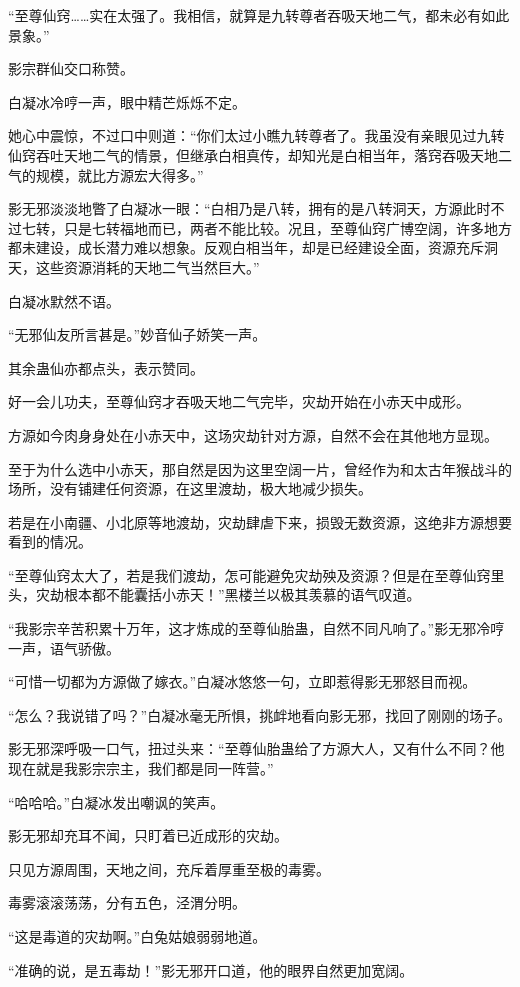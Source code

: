 \begin{this_body}
“至尊仙窍……实在太强了。我相信，就算是九转尊者吞吸天地二气，都未必有如此景象。”

影宗群仙交口称赞。

白凝冰冷哼一声，眼中精芒烁烁不定。

她心中震惊，不过口中则道：“你们太过小瞧九转尊者了。我虽没有亲眼见过九转仙窍吞吐天地二气的情景，但继承白相真传，却知光是白相当年，落窍吞吸天地二气的规模，就比方源宏大得多。”

影无邪淡淡地瞥了白凝冰一眼：“白相乃是八转，拥有的是八转洞天，方源此时不过七转，只是七转福地而已，两者不能比较。况且，至尊仙窍广博空阔，许多地方都未建设，成长潜力难以想象。反观白相当年，却是已经建设全面，资源充斥洞天，这些资源消耗的天地二气当然巨大。”

白凝冰默然不语。

“无邪仙友所言甚是。”妙音仙子娇笑一声。

其余蛊仙亦都点头，表示赞同。

好一会儿功夫，至尊仙窍才吞吸天地二气完毕，灾劫开始在小赤天中成形。

方源如今肉身身处在小赤天中，这场灾劫针对方源，自然不会在其他地方显现。

至于为什么选中小赤天，那自然是因为这里空阔一片，曾经作为和太古年猴战斗的场所，没有铺建任何资源，在这里渡劫，极大地减少损失。

若是在小南疆、小北原等地渡劫，灾劫肆虐下来，损毁无数资源，这绝非方源想要看到的情况。

“至尊仙窍太大了，若是我们渡劫，怎可能避免灾劫殃及资源？但是在至尊仙窍里头，灾劫根本都不能囊括小赤天！”黑楼兰以极其羡慕的语气叹道。

“我影宗辛苦积累十万年，这才炼成的至尊仙胎蛊，自然不同凡响了。”影无邪冷哼一声，语气骄傲。

“可惜一切都为方源做了嫁衣。”白凝冰悠悠一句，立即惹得影无邪怒目而视。

“怎么？我说错了吗？”白凝冰毫无所惧，挑衅地看向影无邪，找回了刚刚的场子。

影无邪深呼吸一口气，扭过头来：“至尊仙胎蛊给了方源大人，又有什么不同？他现在就是我影宗宗主，我们都是同一阵营。”

“哈哈哈。”白凝冰发出嘲讽的笑声。

影无邪却充耳不闻，只盯着已近成形的灾劫。

只见方源周围，天地之间，充斥着厚重至极的毒雾。

毒雾滚滚荡荡，分有五色，泾渭分明。

“这是毒道的灾劫啊。”白兔姑娘弱弱地道。

“准确的说，是五毒劫！”影无邪开口道，他的眼界自然更加宽阔。


\end{this_body}

